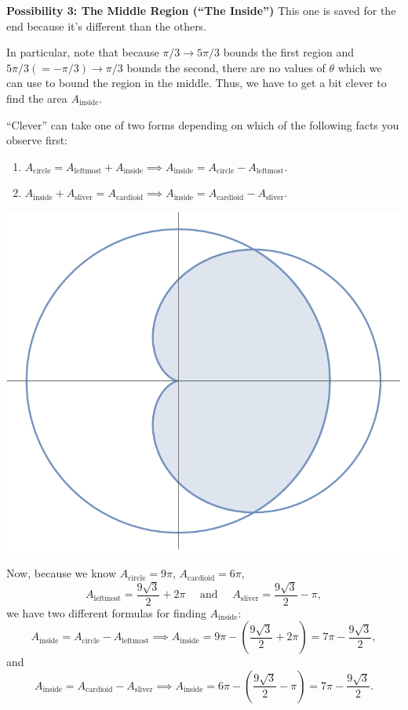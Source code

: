 \documentclass[12pt]{article}
\begin{document}
	\noindent\textbf{Possibility 3: The Middle Region (``The Inside'')}
	This one is saved for the end because it's different than the others.
	
	In particular, note that because $\pi/3\rightarrow5\pi/3$ bounds the first region and $5\pi/3(=-\pi/3)\rightarrow\pi/3$ bounds the second, there are no values of $\theta$ which we can use to bound the region in the middle. Thus, we have to get a bit clever to find the area $A_{\text{inside}}$.
	
	``Clever'' can take one of two forms depending on which of the following facts you observe first:

	\begin{enumerate}
		\item $A_{\text{circle}}=A_{\text{leftmost}}+A_{\text{inside}}\implies A_{\text{inside}}=A_{\text{circle}}-A_{\text{leftmost}}.$
		\item $A_{\text{inside}}+A_{\text{sliver}}=A_{\text{cardioid}}\implies A_{\text{inside}}=A_{\text{cardioid}}-A_{\text{sliver}}.$
	\end{enumerate}

	\begin{center}
		\includegraphics[scale=0.75]{region2}
	\end{center}

	\noindent Now, because we know $A_{\text{circle}}=9\pi$, $A_{\text{cardioid}}=6\pi$, 
	$$A_{\text{leftmost}}=\frac{9\sqrt{3}}{2}+2\pi\quad\text{ and }\quad A_{\text{sliver}}=\frac{9\sqrt{3}}{2}-\pi,$$ we have two different formulas for finding $A_{\text{inside}}$:
	$$A_{\text{inside}}=A_{\text{circle}}-A_{\text{leftmost}}\implies A_{\text{inside}}=9\pi-\left(\frac{9\sqrt{3}}{2}+2\pi\right)=7\pi-\frac{9\sqrt{3}}{2},$$
	and
	$$A_{\text{inside}}=A_{\text{cardioid}}-A_{\text{sliver}}\implies A_{\text{inside}}=6\pi-\left(\frac{9\sqrt{3}}{2}-\pi\right)=7\pi-\frac{9\sqrt{3}}{2}.$$
	
\end{document}

